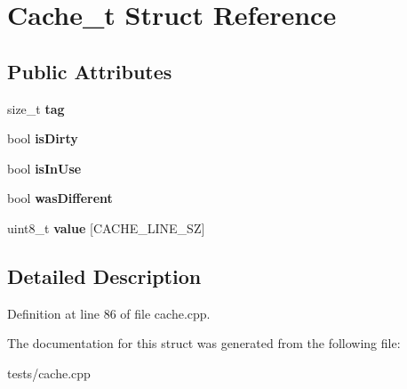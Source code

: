 \hypertarget{structCache__t}{\section{Cache\-\_\-t Struct Reference}
\label{structCache__t}
}
\subsection*{Public Attributes}
\begin{DoxyCompactItemize}
\item 
\hypertarget{structCache__t_a67967f7b43b6691fb092273a42c123fc}{size\-\_\-t {\bfseries tag}}\label{structCache__t_a67967f7b43b6691fb092273a42c123fc}

\item 
\hypertarget{structCache__t_acf888ad575ebd30bd542599158c8c54a}{bool {\bfseries is\-Dirty}}\label{structCache__t_acf888ad575ebd30bd542599158c8c54a}

\item 
\hypertarget{structCache__t_a67017be74a933924e9d72ad9609001d0}{bool {\bfseries is\-In\-Use}}\label{structCache__t_a67017be74a933924e9d72ad9609001d0}

\item 
\hypertarget{structCache__t_aa1b54a0730dd41e3dc1c9cb4c591e6e9}{bool {\bfseries was\-Different}}\label{structCache__t_aa1b54a0730dd41e3dc1c9cb4c591e6e9}

\item 
\hypertarget{structCache__t_ae4f0d05ac8f573c69396005fd034f755}{uint8\-\_\-t {\bfseries value} \mbox{[}C\-A\-C\-H\-E\-\_\-\-L\-I\-N\-E\-\_\-\-S\-Z\mbox{]}}\label{structCache__t_ae4f0d05ac8f573c69396005fd034f755}

\end{DoxyCompactItemize}


\subsection{Detailed Description}


Definition at line 86 of file cache.\-cpp.



The documentation for this struct was generated from the following file\-:\begin{DoxyCompactItemize}
\item 
tests/cache.\-cpp\end{DoxyCompactItemize}
